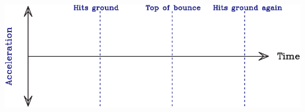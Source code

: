 \documentclass[12pt]{article}
\begin{document}
\begin{enumerate}
\begin{center}
	\vspace{0.4in}
	
	\includegraphics[width=\textwidth]{acceleration-crop.pdf}
\end{center}







\newpage



\end{enumerate}
\end{document}
